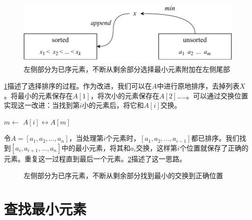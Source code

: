 \documentclass[b5paper]{ctexart}
\begin{document}
\begin{figure}[htbp]
  \centering
  \includegraphics[scale=0.8]{img/ssort}
  \caption{左侧部分为已序元素，不断从剩余部分选择最小元素附加在左侧尾部}
  \label{fig:sel-sort}
\end{figure}

\cref{fig:sel-sort}描述了选择排序的过程。作为改进，我们可以在$A$中进行原地排序，去掉列表$X$。将最小的元素保存在$A[1]$，将次小的元素保存在$A[2]$……。可以通过交换位置实现这一改进：当找到第$i$小的元素后，将它和$A[i]$交换。

\begin{algorithmic}[1]
    \State $m \gets$ 
    \State {} $A[i] \leftrightarrow A[m]$
  \EndFor
\EndFunction
\end{algorithmic}

令$A = [a_1, a_2, ..., a_n]$，当处理第$i$个元素时，$[a_1, a_2, ..., a_{i-1}]$都已排序。我们找到$[a_i, a_{i+1}, ..., a_n]$中的最小元素，将其和$a_i$交换，这样第$i$个位置就保存了正确的元素。重复这一过程直到最后一个元素。\cref{fig:in-place-ssort}描述了这一思路。

\begin{figure}[htbp]
  \centering
  \caption{左侧部分为已序元素，不断从剩余部分找到最小的交换到正确位置}
  \label{fig:in-place-ssort}
\end{figure}

\section{查找最小元素}
\end{document}
